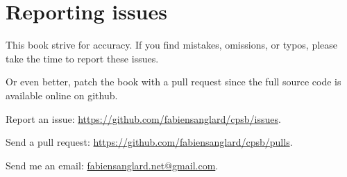 \chapter*{Reporting issues}
This book strive for accuracy. If you find mistakes, omissions, or typos, please take the time to report these issues. 

Or even better, patch the book with a pull request since the full source code is available online on github.


Report an issue: \href{https://github.com/fabiensanglard/cpsb/issues}{https://github.com/fabiensanglard/cpsb/issues}.

Send a pull request: \href{https://github.com/fabiensanglard/cpsb/pulls}{https://github.com/fabiensanglard/cpsb/pulls}.

Send me an email: \href{mailto:fabiensanglard.net@gmail.com}{fabiensanglard.net@gmail.com}.
